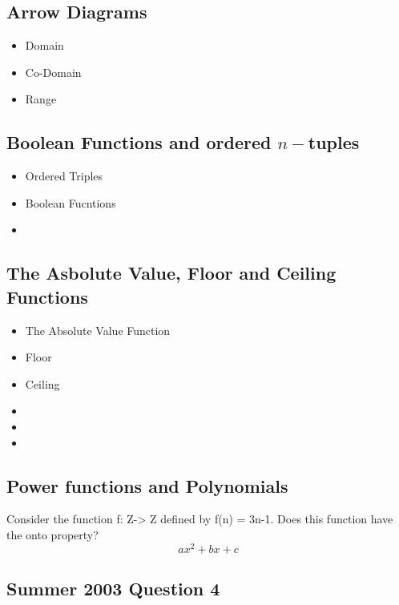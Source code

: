 \documentclass{article}
\begin{document}
\subsection{Arrow Diagrams}

\begin{itemize}
\item Domain 
\item Co-Domain 
\item Range
\end{itemize}

\newpage
\subsection{Boolean Functions and ordered $n-$tuples}


\begin{itemize}
\item Ordered Triples
\item Boolean Fucntions
\item
\end{itemize}

\subsection*{The Asbolute Value, Floor and Ceiling Functions}
\begin{itemize}
\item The Absolute Value Function
\item Floor
\item Ceiling
\end{itemize}



\begin{itemize}
\item
\item
\item
\end{itemize}

\subsection*{Power functions and Polynomials}


Consider the function f: Z-> Z defined by f(n) = 3n-1. Does this function have the onto property?
\[ax^2 + bx + c\]
\subsection*{Summer 2003 Question 4}
\end{document}
